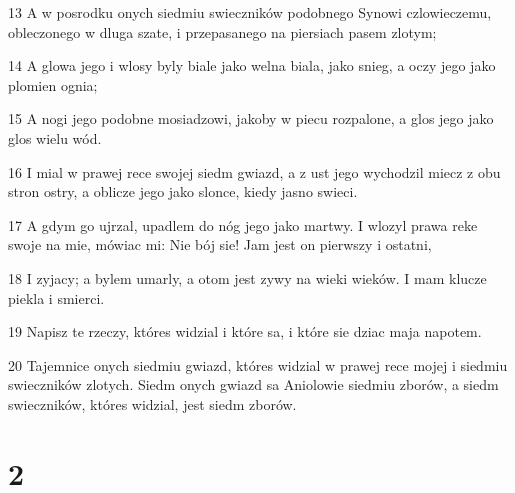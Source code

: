 \par 13 A w posrodku onych siedmiu swieczników podobnego Synowi czlowieczemu, obleczonego w dluga szate, i przepasanego na piersiach pasem zlotym;
\par 14 A glowa jego i wlosy byly biale jako welna biala, jako snieg, a oczy jego jako plomien ognia;
\par 15 A nogi jego podobne mosiadzowi, jakoby w piecu rozpalone, a glos jego jako glos wielu wód.
\par 16 I mial w prawej rece swojej siedm gwiazd, a z ust jego wychodzil miecz z obu stron ostry, a oblicze jego jako slonce, kiedy jasno swieci.
\par 17 A gdym go ujrzal, upadlem do nóg jego jako martwy. I wlozyl prawa reke swoje na mie, mówiac mi: Nie bój sie! Jam jest on pierwszy i ostatni,
\par 18 I zyjacy; a bylem umarly, a otom jest zywy na wieki wieków. I mam klucze piekla i smierci.
\par 19 Napisz te rzeczy, któres widzial i które sa, i które sie dziac maja napotem.
\par 20 Tajemnice onych siedmiu gwiazd, któres widzial w prawej rece mojej i siedmiu swieczników zlotych. Siedm onych gwiazd sa Aniolowie siedmiu zborów, a siedm swieczników, któres widzial, jest siedm zborów.

\chapter{2}


